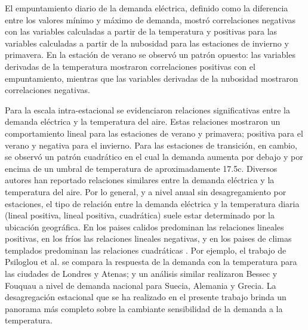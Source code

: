\documentclass[11pt,a4paper]{article}
\begin{document}
El empuntamiento diario de la demanda eléctrica, definido como la diferencia entre los valores mínimo y máximo de demanda, mostró correlaciones negativas con las variables calculadas a partir de la temperatura y positivas para las variables calculadas a partir de la nubosidad para las estaciones de invierno y primavera. En la estación de verano se observó un patrón opuesto: las variables derivadas de la temperatura mostraron correlaciones positivas con el empuntamiento, mientras que las variables derivadas de la nubosidad mostraron correlaciones negativas.

Para la escala intra-estacional se evidenciaron relaciones significativas entre la demanda eléctrica y la temperatura del aire. Estas relaciones mostraron un comportamiento lineal para las estaciones de verano y primavera; positiva para el verano y negativa para el invierno. Para las estaciones de transición, en cambio, se observó un patrón cuadrático en el cual la demanda aumenta por debajo y por encima de un umbral de temperatura de aproximadamente 17.5\degree c. Diversos autores han reportado relaciones similares entre la demanda eléctrica y la temperatura del aire. Por lo general, y a nivel anual sin desagregamiento por estaciones, el tipo de relación entre la demanda eléctrica y la temperatura diaria (lineal positiva, lineal positiva, cuadrática) suele estar determinado por la ubicación geográfica. En los paises calidos predominan las relaciones lineales positivas, en los fríos las relaciones lineales negativas, y en los paises de climas templados predominan las relaciones cuadráticas \cite{moral2005modelling,apadula2012relationships,cassarino2018impact,detemperatura}. Por ejemplo, el trabajo de Psiloglou et al. \cite{psiloglou2009factors} se compara la respuesta de la demanda con la temperatura para las ciudades de Londres y Atenas; y un análisis similar realizaron Bessec y Fouquau \cite{bessec2008non} a nivel de demanda nacional para Suecia, Alemania y Grecia. La desagregación estacional que se ha realizado en el presente trabajo brinda un panorama más completo sobre la cambiante sensibilidad de la demanda a la temperatura.
\end{document}
